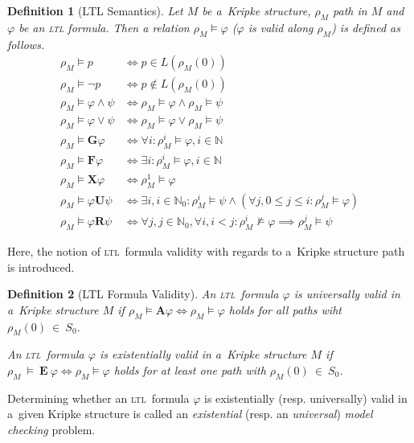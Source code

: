 \documentclass[12pt,oneside,draft]{fithesis}
\newcommand{\ltl}{\textsc{ltl}~}
\newcommand{\mNatural}{\mathbb{N}}
\newcommand{\bF}{\mathbf{F}}
\newcommand{\bG}{\mathbf{G}}
\newcommand{\bX}{\mathbf{X}}
\newcommand{\bU}{\mathbf{U}}
\newcommand{\bR}{\mathbf{R}}
\newcommand{\bA}{\mathbf{A}}
\newcommand{\bE}{\mathbf{E}}
\newtheorem{mydef}{Definition}
\begin{document}
\begin{mydef}[LTL Semantics]
Let $M$ be a~Kripke structure, $\rho_M$ path in $M$ and $\varphi$ be
an \textsc{ltl} formula. Then a relation $\rho_M\models\varphi$
($\varphi$ is valid along $\rho_M$) is defined as follows\cite{clarke}.
\begin{align}
	\rho_M\models p&\iff p\in L(\rho_M(0))\\
	\rho_M\models\neg p&\iff p\notin L(\rho_M(0))\\
	\rho_M\models \varphi\wedge\psi&\iff\rho_M\models\varphi\wedge
		\rho_M\models\psi\\
	\rho_M\models \varphi\vee\psi&\iff\rho_M\models\varphi\vee
		\rho_M\models\psi\\
	\rho_M\models\bG\varphi&\iff\forall i:\rho_M^i\models\varphi,
		i\in\mNatural\\
	\rho_M\models\bF\varphi&\iff\exists i:\rho_M^i\models\varphi,
		i\in\mNatural\\
	\rho_M\models\bX\varphi&\iff\rho_M^1\models\varphi\\
	\rho_M\models\varphi\bU\psi&\iff\exists i,i\in\mNatural_0:
		\rho_M^i\models\psi\wedge(\forall j,0\leq j\leq i:
			\rho_M^j\models\varphi)\\
	\rho_M\models\varphi\bR\psi&\iff\forall j,j\in\mNatural_0,
		\forall i,i<j:\rho_M^i\not\models\varphi\implies
			\rho_M^j\models\psi
\end{align}
\end{mydef}

Here, the notion of \ltl formula validity with regards to a~Kripke
structure path is introduced.
\begin{mydef}[LTL Formula Validity]
An \ltl formula $\varphi$ is universally valid in a~Kripke structure $M$
if $\rho_M\models\bA\varphi\iff\rho_M\models\varphi$ holds for all
paths wiht $\rho_M(0)~\in~S_0$.

An \ltl formula $\varphi$ is existentially valid in a~Kripke structure
$M$ if $\rho_M~\models~\bE~\varphi\iff\rho_M\models\varphi$ holds for
at least one path with $\rho_M(0)~\in~S_0$\cite{biere}.
\end{mydef}

Determining whether an \ltl formula $\varphi$ is existentially (resp.
universally) valid in a~given Kripke structure is called an
\emph{existential} (resp. an \emph{universal}) \emph{model checking}
problem\cite{biere}.
\end{document}
